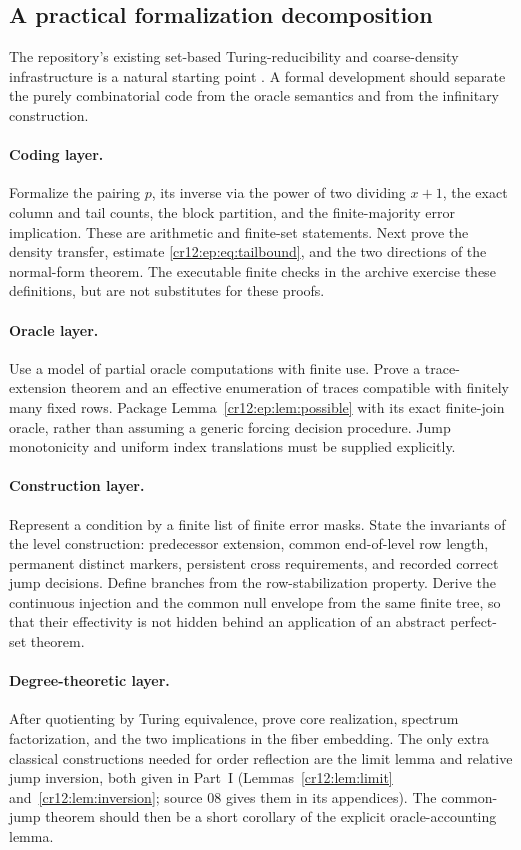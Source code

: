 \documentclass[11pt,letterpaper]{article}
\theoremstyle{plain}
\theoremstyle{definition}
\theoremstyle{remark}
\numberwithin{equation}{section}
\begin{document}
\subsection{A practical formalization decomposition}\label{cr12:ep:subsec:formal}
The repository's existing set-based Turing-reducibility and coarse-density
infrastructure is a natural starting point \cite{RepoReadme}. A formal development
should separate the purely combinatorial code from the oracle semantics and from the
infinitary construction.

\paragraph{Coding layer.}
Formalize the pairing $p$, its inverse via the power of two dividing $x+1$, the exact
column and tail counts, the block partition, and the finite-majority error
implication. These are arithmetic and finite-set statements. Next prove the density
transfer, estimate \eqref{cr12:ep:eq:tailbound}, and the two directions of the
normal-form theorem. The executable finite checks in the archive exercise these
definitions, but are not substitutes for these proofs.

\paragraph{Oracle layer.}
Use a model of partial oracle computations with finite use. Prove a trace-extension
theorem and an effective enumeration of traces compatible with finitely many fixed
rows. Package Lemma~\ref{cr12:ep:lem:possible} with its exact finite-join oracle,
rather than assuming a generic forcing decision procedure. Jump monotonicity and
uniform index translations must be supplied explicitly.

\paragraph{Construction layer.}
Represent a condition by a finite list of finite error masks. State the invariants of
the level construction: predecessor extension, common end-of-level row length,
permanent distinct markers, persistent cross requirements, and recorded correct jump
decisions. Define branches from the row-stabilization property. Derive the
continuous injection and the common null envelope from the same finite tree, so that
their effectivity is not hidden behind an application of an abstract perfect-set
theorem.

\paragraph{Degree-theoretic layer.}
After quotienting by Turing equivalence, prove core realization, spectrum
factorization, and the two implications in the fiber embedding. The only extra
classical constructions needed for order reflection are the limit lemma and relative
jump inversion, both given in Part~I (Lemmas~\ref{cr12:lem:limit}
and~\ref{cr12:lem:inversion}; source 08 gives them in its appendices). The
common-jump theorem should then be a short corollary of the explicit
oracle-accounting lemma.
\end{document}
